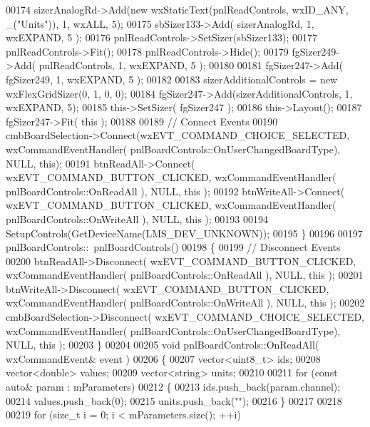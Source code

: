 \begin{DoxyCode}
{00174     sizerAnalogRd->Add(\textcolor{keyword}{new} wxStaticText(pnlReadControls, wxID\_ANY, \_(\textcolor{stringliteral}{"Units"})), 1, wxALL, 5);
00175     sbSizer133->Add( sizerAnalogRd, 1, wxEXPAND, 5 );
00176     pnlReadControls->SetSizer(sbSizer133);
00177     pnlReadControls->Fit();
00178     pnlReadControls->Hide();
00179     fgSizer249->Add( pnlReadControls, 1, wxEXPAND, 5 );
00180 
00181     fgSizer247->Add( fgSizer249, 1, wxEXPAND, 5 );
00182 
00183     sizerAdditionalControls = \textcolor{keyword}{new} wxFlexGridSizer(0, 1, 0, 0);
00184     fgSizer247->Add(sizerAdditionalControls, 1, wxEXPAND, 5);
00185     this->SetSizer( fgSizer247 );
00186     this->Layout();
00187     fgSizer247->Fit( \textcolor{keyword}{this} );
00188 
00189     \textcolor{comment}{// Connect Events}
00190     cmbBoardSelection->Connect(wxEVT\_COMMAND\_CHOICE\_SELECTED, wxCommandEventHandler(
      pnlBoardControls::OnUserChangedBoardType), NULL, \textcolor{keyword}{this});
00191     btnReadAll->Connect( wxEVT\_COMMAND\_BUTTON\_CLICKED, wxCommandEventHandler( 
      pnlBoardControls::OnReadAll ), NULL, \textcolor{keyword}{this} );
00192     btnWriteAll->Connect( wxEVT\_COMMAND\_BUTTON\_CLICKED, wxCommandEventHandler( 
      pnlBoardControls::OnWriteAll ), NULL, \textcolor{keyword}{this} );
00193 
00194     SetupControls(GetDeviceName(LMS_DEV_UNKNOWN));
00195 \}
00196 
00197 pnlBoardControls::~pnlBoardControls()
00198 \{
00199     \textcolor{comment}{// Disconnect Events}
00200     btnReadAll->Disconnect( wxEVT\_COMMAND\_BUTTON\_CLICKED, wxCommandEventHandler( 
      pnlBoardControls::OnReadAll ), NULL, \textcolor{keyword}{this} );
00201     btnWriteAll->Disconnect( wxEVT\_COMMAND\_BUTTON\_CLICKED, wxCommandEventHandler( 
      pnlBoardControls::OnWriteAll ), NULL, \textcolor{keyword}{this} );
00202     cmbBoardSelection->Disconnect( wxEVT\_COMMAND\_CHOICE\_SELECTED, wxCommandEventHandler( 
      pnlBoardControls::OnUserChangedBoardType), NULL, \textcolor{keyword}{this} );
00203 \}
00204 
00205 \textcolor{keywordtype}{void} pnlBoardControls::OnReadAll( wxCommandEvent& event )
00206 \{
00207     vector<uint8\_t> ids;
00208     vector<double> values;
00209     vector<string> units;
00210 
00211     \textcolor{keywordflow}{for} (\textcolor{keyword}{const} \textcolor{keyword}{auto}& param : mParameters)
00212     \{
00213         ids.push\_back(param.channel);
00214         values.push\_back(0);
00215         units.push\_back(\textcolor{stringliteral}{""});
00216     \}
00217 
00218 
00219     \textcolor{keywordflow}{for} (\textcolor{keywordtype}{size\_t} i = 0; i < mParameters.size(); ++i)
}
\end{DoxyCode}
